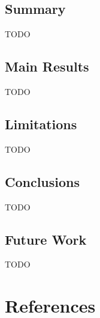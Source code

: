 \documentclass[a4paper,11pt]{article}
\begin{document}
    \vspace{0.5cm}
    \subsection{Summary}
        TODO

    \vspace{0.5cm}
    \subsection{Main Results}
        TODO

    \vspace{0.5cm}
    \subsection{Limitations}
        TODO
        
    \vspace{0.5cm}
    \subsection{Conclusions}
        TODO

    \vspace{0.5cm}
    \subsection{Future Work}
        TODO

    \clearpage %
    \section{References}\label{sec:references}
        \printbibliography[heading=none]
        
\end{document}

